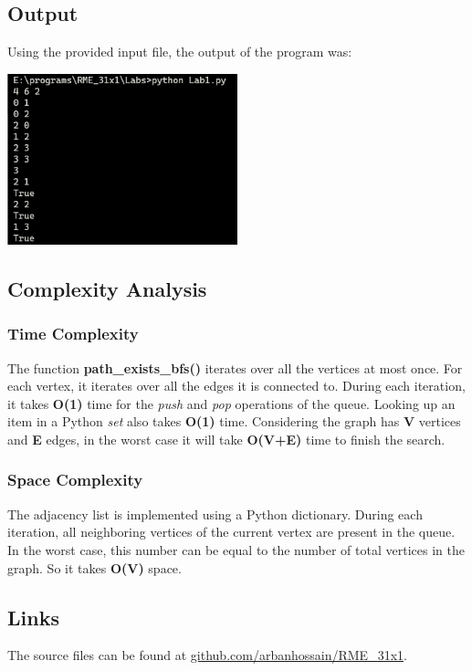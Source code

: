 \documentclass[12pt]{article}
\begin{document}
\subsection*{Output}
Using the provided input file, the output of the program was:
\begin{center}
    \includegraphics[width=0.5\textwidth]{Output.png}
\end{center}

\subsection*{Complexity Analysis}
\subsubsection*{Time Complexity}
The function \textbf{path\_exists\_bfs()} iterates over all the vertices at most once. For each vertex, it iterates over all the edges it is connected to. During each iteration, it takes \textbf{O(1)} time for the \textit{push} and \textit{pop} operations of the queue. Looking up an item in a Python \textit{set} also takes \textbf{O(1)} time. Considering the graph has \textbf{V} vertices and \textbf{E} edges, in the worst case it will take \textbf{O(V+E)} time to finish the search.

\subsubsection*{Space Complexity}
The adjacency list is implemented using a Python dictionary. During each iteration, all neighboring vertices of the current vertex are present in the queue. In the worst case, this number can be equal to the number of total vertices in the graph. So it takes \textbf{O(V)} space.

\subsection*{Links}
The source files can be found at \href{https://github.com/arbanhossain/RME_31x1/tree/main/Labs}{github.com/arbanhossain/RME\_31x1}.
\end{document}
